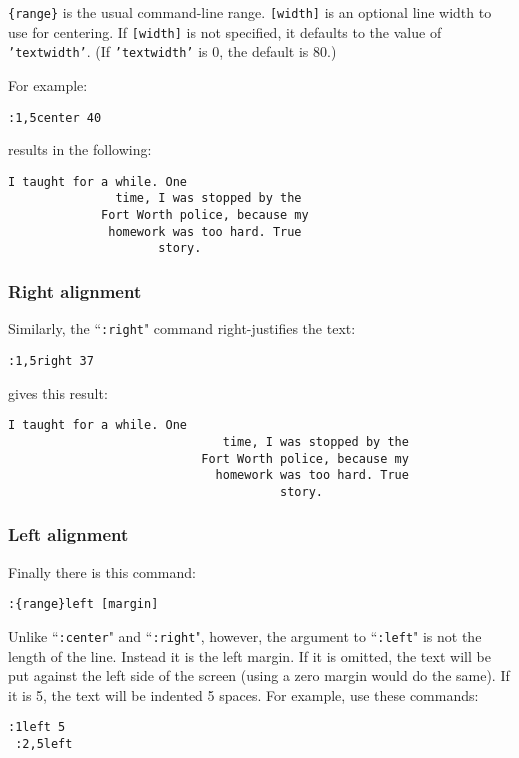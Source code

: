 \texttt{\{range\}} is the usual command-line range.
\texttt{[width]} is an optional line width to use for centering.
If \texttt{[width]} is not specified, it defaults to the value of \texttt{'textwidth'}.
(If \texttt{'textwidth'} is 0, the default is 80.)

For example:

\begin{Verbatim}[samepage=true]
 :1,5center 40
\end{Verbatim}

results in the following:

\begin{Verbatim}[samepage=true]
			   I taught for a while. One 
			   time, I was stopped by the 
			 Fort Worth police, because my 
			  homework was too hard. True 
				     story. 
\end{Verbatim}
\subsubsection{Right alignment}
Similarly, the ``\texttt{:right}" command right-justifies the text:

\begin{Verbatim}[samepage=true]
 :1,5right 37
\end{Verbatim}

gives this result:

\begin{Verbatim}[samepage=true]
						       I taught for a while. One 
						      time, I was stopped by the 
						   Fort Worth police, because my 
						     homework was too hard. True 
									  story. 
\end{Verbatim}
\subsubsection{Left alignment}
Finally there is this command:

\begin{Verbatim}[samepage=true]
 :{range}left [margin]
\end{Verbatim}

Unlike ``\texttt{:center}" and ``\texttt{:right}", however, the argument to ``\texttt{:left}" is not the length of the line.
Instead it is the left margin.
If it is omitted, the text will be put against the left side of the screen (using a zero margin would do the same).
If it is 5, the text will be indented 5 spaces.
For example, use these commands:

\begin{Verbatim}[samepage=true]
 :1left 5
 :2,5left
\end{Verbatim}

